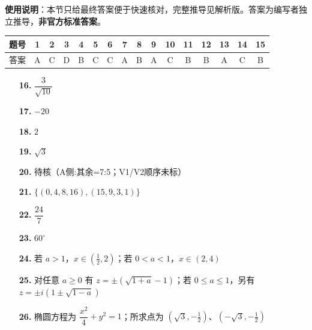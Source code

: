 
\begin{gknotice}
\textbf{使用说明}：本节只给最终答案便于快速核对，完整推导见解析版。答案为编写者独立推导，\textbf{非官方标准答案}。
\end{gknotice}

\begin{center}\begin{tabular}{cccccccccccccccc}
\toprule
题号 & 1 & 2 & 3 & 4 & 5 & 6 & 7 & 8 & 9 & 10 & 11 & 12 & 13 & 14 & 15 \\
\midrule
答案 & A & C & D & B & C & C & A & B & A & C & B & B & A & C & B \\
\bottomrule
\end{tabular}\end{center}

\begin{itemize}[leftmargin=2.6em]
  \item[\textbf{16.}] $\dfrac{3}{\sqrt{10}}$
  \item[\textbf{17.}] $-20$
  \item[\textbf{18.}] $2$
  \item[\textbf{19.}] $\sqrt3$
  \item[\textbf{20.}] 待核（A侧:其余=7:5；V1/V2顺序未标）
\end{itemize}

\begin{itemize}[leftmargin=2.6em]
  \item[\textbf{21.}] $\{(0,4,8,16),(15,9,3,1)\}$
  \item[\textbf{22.}] $\dfrac{24}{7}$
  \item[\textbf{23.}] $60^\circ$
  \item[\textbf{24.}] 若 $a>1$，$x\in(\frac12,2)$；若 $0<a<1$，$x\in(2,4)$
  \item[\textbf{25.}] 对任意 $a\ge0$ 有 $z=\pm(\sqrt{1+a}-1)$；若 $0\le a\le1$，另有 $z=\pm i(1\pm\sqrt{1-a})$
  \item[\textbf{26.}] 椭圆方程为 $\dfrac{x^2}{4}+y^2=1$；所求点为 $(\sqrt3,-\frac12)$、$(-\sqrt3,-\frac12)$
\end{itemize}
